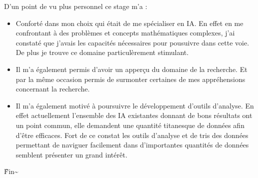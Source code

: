 D'un point de vu plus personnel ce stage m'a :
\begin{itemize}
\item Conforté dans mon choix qui était de me spécialiser en IA. En effet en me confrontant à des problèmes et concepts mathématiques complexes, j'ai constaté que j'avais les capacités nécessaires pour pousuivre dans cette voie. De plus je trouve ce domaine particulèrement stimulant.

\item Il m'a également permis d'avoir un apperçu du domaine de la recherche. Et par la même occasion permis de surmonter certaines de mes appréhensions concernant la recherche.

\item Il m'a également motivé à poursuivre le développement d'outils d'analyse. En effet actuellement l'ensemble des IA existantes donnant de bons résultats ont un point commun, elle demandent une quantité titanesque de données afin d'être efficaces. Fort de ce constat les outils d'analyse et de tris des données permettant de naviguer facilement dans d'importantes quantités de données semblent présenter un grand intérêt.
\end{itemize}





\centering
\~Fin\~
